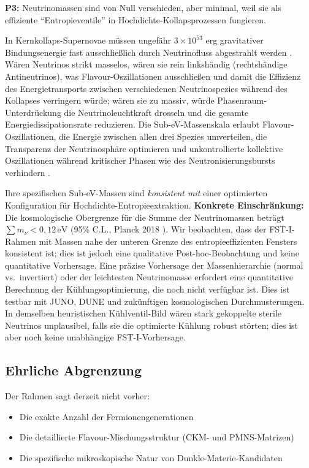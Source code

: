 \documentclass[12pt,a4paper]{article}
\theoremstyle{remark}
\begin{document}
\textbf{P3:} Neutrinomassen sind von Null verschieden, aber minimal, weil sie als effiziente ``Entropieventile'' in Hochdichte-Kollapsprozessen fungieren.

In Kernkollaps-Supernovae m\"ussen ungef\"ahr $3 \times 10^{53}$ erg gravitativer Bindungsenergie fast ausschlie\ss{}lich durch Neutrinofluss abgestrahlt werden \citep{SupernovaNeutrinos,SupernovaSimulations}. W\"aren Neutrinos strikt masselos, w\"aren sie rein linksh\"andig (rechtsh\"andige Antineutrinos), was Flavour-Oszillationen ausschlie\ss{}en und damit die Effizienz des Energietransports zwischen verschiedenen Neutrinospezies w\"ahrend des Kollapses verringern w\"urde; w\"aren sie zu massiv, w\"urde Phasenraum-Unterdr\"uckung die Neutrinoleuchtkraft drosseln und die gesamte Energiedissipationsrate reduzieren. Die Sub-eV-Massenskala erlaubt Flavour-Oszillationen, die Energie zwischen allen drei Spezies umverteilen, die Transparenz der Neutrinosph\"are optimieren und unkontrollierte kollektive Oszillationen w\"ahrend kritischer Phasen wie des Neutronisierungsbursts verhindern \citep{NeutrinoOscillations}.

Ihre spezifischen Sub-eV-Massen sind \emph{konsistent mit} einer optimierten Konfiguration f\"ur Hochdichte-Entropieextraktion. \textbf{Konkrete Einschr\"ankung:} Die kosmologische Obergrenze f\"ur die Summe der Neutrinomassen betr\"agt $\sum m_\nu < 0{,}12\,\text{eV}$ (95\% C.L., Planck 2018 \citep{Planck2018}). Wir beobachten, dass der FST-I-Rahmen mit Massen nahe der unteren Grenze des entropieeffizienten Fensters konsistent ist; dies ist jedoch eine qualitative Post-hoc-Beobachtung und keine quantitative Vorhersage. Eine pr\"azise Vorhersage der Massenhierarchie (normal vs.\ invertiert) oder der leichtesten Neutrinomasse erfordert eine quantitative Berechnung der K\"uhlungsoptimierung, die noch nicht verf\"ugbar ist. Dies ist testbar mit JUNO, DUNE und zuk\"unftigen kosmologischen Durchmusterungen. In demselben heuristischen K\"uhlventil-Bild w\"aren stark gekoppelte sterile Neutrinos unplausibel, falls sie die optimierte K\"uhlung robust st\"orten; dies ist aber noch keine unabh\"angige FST-I-Vorhersage.

\subsection{Ehrliche Abgrenzung}

Der Rahmen sagt derzeit nicht vorher:
\begin{itemize}
    \item Die exakte Anzahl der Fermionengenerationen
    \item Die detaillierte Flavour-Mischungsstruktur (CKM- und PMNS-Matrizen)
    \item Die spezifische mikroskopische Natur von Dunkle-Materie-Kandidaten
\end{itemize}
\end{document}
